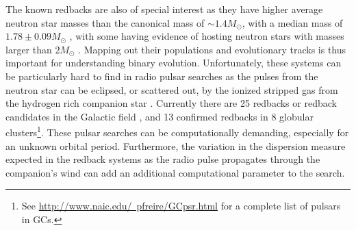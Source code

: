 \documentclass[fleqn,usenatbib,useAMS,letters]{mnras}
\begin{document}

The known redbacks are also of special interest as 
they 
have higher average neutron star masses than the canonical mass of $\sim 1.4M_\odot$, with a median mass of $1.78 \pm 0.09 M_{\odot}$ \citep{Strader2019Redbacks}, with some having evidence of hosting neutron stars with masses larger than $2 M_\odot$ \citep{Linares2018,Strader2019Redbacks,Kandel20}. Mapping out their populations and evolutionary tracks is thus important for understanding binary evolution. Unfortunately, these systems can be particularly hard to find in radio pulsar searches as the pulses from the neutron star can be eclipsed, or scattered out, by the ionized stripped gas from the hydrogen rich companion star \cite[e.g.][]{FruchterEclipse1988}. Currently there are 25 redbacks or redback candidates in the Galactic field \citep{Strader2019Redbacks,2020SwihartRedback}, and %
13 confirmed redbacks in 8 globular clusters\footnote{See \href{http://www.naic.edu/~pfreire/GCpsr.html}{http://www.naic.edu/~pfreire/GCpsr.html} for a complete list of pulsars in GCs.}. These pulsar searches can be computationally demanding, especially for an unknown orbital period. Furthermore, the variation in the dispersion measure expected in the redback systems as the radio pulse propagates through the companion's wind can add an additional computational parameter %
to the search. 






\end{document}
